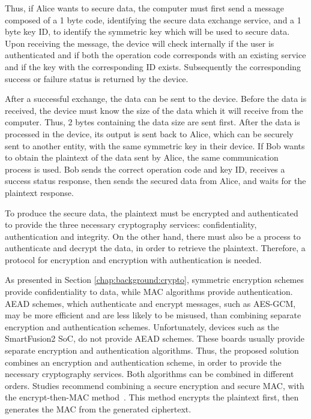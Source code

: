 Thus, if Alice wants to secure data, the computer must first send a message composed of a 1 byte code, identifying the secure data exchange service, and a 1 byte key ID, to identify the symmetric key which will be used to secure data.
Upon receiving the message, the device will check internally if the user is authenticated and if both the operation code corresponds with an existing service and if the key with the corresponding ID exists.
Subsequently the corresponding success or failure status is returned by the device.

After a successful exchange, the data can be sent to the device. Before the data is received, the device must know the size of the data which it will receive from the computer. Thus, 2 bytes containing the data size are sent first.
After the data is processed in the device, its output is sent back to Alice, which can be securely sent to another entity, with the same symmetric key in their device.
If Bob wants to obtain the plaintext of the data sent by Alice, the same communication process is used. Bob sends the correct operation code and key ID, receives a success status response, then sends the secured data from Alice, and waits for the plaintext response. 

To produce the secure data, the plaintext must be encrypted and authenticated to provide the three necessary cryptography services: confidentiality, authentication and integrity.
On the other hand, there must also be a process to authenticate and decrypt the data, in order to retrieve the plaintext. Therefore, a protocol for encryption and encryption with authentication is needed.

As presented in Section \ref{chap:background:crypto}, symmetric encryption schemes provide confidentiality to data, while MAC algorithms provide authentication. AEAD schemes, which authenticate and encrypt messages, such as AES-GCM, may be more efficient and are less likely to be misused, than combining separate encryption and authentication schemes.
Unfortunately, devices such as the SmartFusion2 SoC, do not provide AEAD schemes. These boards usually provide separate encryption and authentication algorithms.
Thus, the proposed solution combines an encryption and authentication scheme, in order to provide the necessary cryptography services.
Both algorithms can be combined in different orders. Studies recommend combining a secure encryption and secure MAC, with the encrypt-then-MAC method~\cite{encryptmacorder}. This method encrypts the plaintext first, then generates the MAC from the generated ciphertext.

